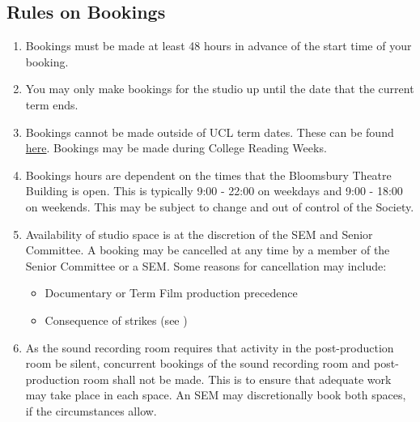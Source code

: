 \documentclass[]{article}
\begin{document}
\subsection{Rules on Bookings}
\begin{enumerate}
    \item Bookings must be made at least 48 hours in advance of the start time of your booking.
    \item You may only make bookings for the studio up until the date that the current term ends.
    \item Bookings cannot be made outside of UCL term dates. These can be found \href{https://www.ucl.ac.uk/students/life-ucl/term-dates-and-closures-2021-22}{here}. Bookings may be made during College Reading Weeks.
    \item Bookings hours are dependent on the times that the Bloomsbury Theatre Building is open. This is typically 9:00 - 22:00 on weekdays and 9:00 - 18:00 on weekends. This may be subject to change and out of control of the Society.
    \item Availability of studio space is at the discretion of the SEM and Senior Committee. A booking may be cancelled at any time by a member of the Senior Committee or a SEM. Some reasons for cancellation may include:
          \begin{itemize}
              \item Documentary or Term Film production precedence
              \item Consequence of strikes (see )
          \end{itemize}
    \item As the sound recording room requires that activity in the post-production room be silent, concurrent bookings of the sound recording room and post-production room shall not be made. This is to ensure that adequate work may take place in each space. An SEM may discretionally book both spaces, if the circumstances allow.
\end{enumerate}
\end{document}
